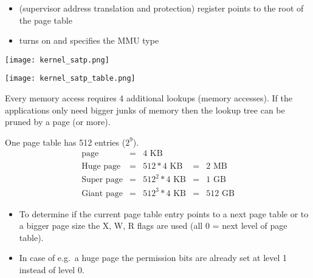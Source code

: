 \renewcommand{\arraystretch}{1}
\setlength\tabcolsep{\oldtabcolsep}

\newpar{}
\begin{itemize}
    \item {} (supervisor address translation and protection) register points to the root of the page table
    \item {} turns on and specifies the MMU type
\end{itemize}
\begin{center}
    \texttt{[image: kernel\_satp.png]}
\end{center}
\begin{center}
    \texttt{[image: kernel\_satp\_table.png]}
\end{center}

\newpar{}

Every memory access requires 4 additional lookups (memory accesses). If the applications only need bigger junks of memory then the lookup tree can be pruned by a page (or more).

\newpar{}
One page table has 512 entries ($2^9$).
\begin{align*}
    \text{page}       & = & 4\text{~KB}         &   &               \\
    \text{Huge page}  & = & 512 * 4\text{~KB}   & = & 2\text{~MB}   \\
    \text{Super page} & = & 512^2 * 4\text{~KB} & = & 1\text{~GB}   \\
    \text{Giant page} & = & 512^3 * 4\text{~KB} & = & 512\text{~GB}
\end{align*}

\begin{itemize}
    \item To determine if the current page table entry points to a next page table or to a bigger page size the X, W, R flags are used (all 0 = next level of page table).
    \item In case of e.g.\ a huge page the permission bits are already set at level 1 instead of level 0.
\end{itemize}




